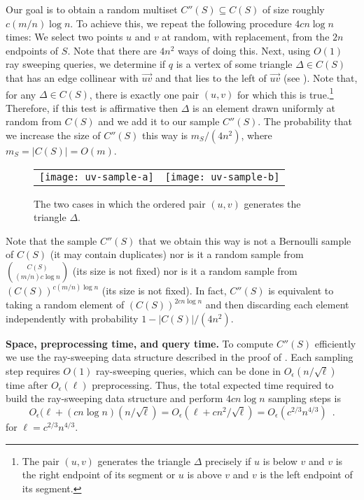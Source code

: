 \documentclass{patmorin}
\newcommand{\Oe}{O_\epsilon}
\begin{document}
Our goal is to obtain a random multiset $C''(S)\subseteq C(S)$ of size
roughly $c(m/n)\log n$.  To achieve this, we repeat the following
procedure $4cn\log n$ times:  We select two points $u$ and $v$ at random,
with replacement, from the $2n$ endpoints of $S$.  Note that there are
$4n^2$ ways of doing this.  Next, using $O(1)$ ray sweeping queries,
we determine if $q$ is a vertex of some triangle $\Delta\in C(S)$ that
has an edge collinear with $\overrightarrow{uv}$ and that lies to the
left of $\overrightarrow{uv}$ (see ).  Note that,
for any $\Delta\in C(S)$, there is exactly one pair $(u,v)$ for which
this is true.\footnote{The pair $(u,v)$ generates the triangle $\Delta$
precisely if $u$ is below $v$ and $v$ is the right endpoint of its
segment or $u$ is above $v$ and $v$ is the left endpoint of its segment.}
Therefore, if this test is affirmative then $\Delta$ is an element drawn
uniformly at random from $C(S)$ and we add it to our sample $C''(S)$.
The probability that we increase the size of $C''(S)$ this way is 
$m_S/(4n^2)$, where $m_S=|C(S)|=O(m)$.

\begin{figure}
  \begin{center}
    \begin{tabular}{cc}
      \texttt{[image: uv-sample-a]} &
      \texttt{[image: uv-sample-b]} \\
    \end{tabular}
  \end{center}
  \caption{The two cases in which the ordered pair $(u,v)$ generates the
           triangle $\Delta$.}
\end{figure}

Note that the sample $C''(S)$ that we obtain this way is not a Bernoulli
sample of $C(S)$ (it may contain duplicates) nor is it a random sample from
${C(S)\choose (m/n)c\log n}$ (its size is not fixed) nor is it a random
sample from $(C(S))^{c(m/n)\log n}$ (its size is not fixed).  In fact,
$C''(S)$ is equivalent to taking a random element of $(C(S))^{2cn\log n}$
and then discarding each element independently with probability $1-
|C(S)|/(4n^2)$.  

\noindent\textbf{Space, preprocessing time, and query time.}
To compute $C''(S)$ efficiently we use the ray-sweeping data structure
described in the proof of .  Each sampling
step requires $O(1)$ ray-sweeping queries, which can be done in
$\Oe(n/\sqrt{\ell})$ time after $\Oe(\ell)$ preprocessing.  Thus, the total
expected time required to build the ray-sweeping data structure and
perform $4cn\log n$ sampling steps is
\[
    \Oe(\ell + (cn\log n)(n/\sqrt{\ell})
       = \Oe(\ell + cn^2/\sqrt{\ell})
       = \Oe(c^{2/3}n^{4/3}) \enspace .
\]
for $\ell=c^{2/3}n^{4/3}$. 
\end{document}
